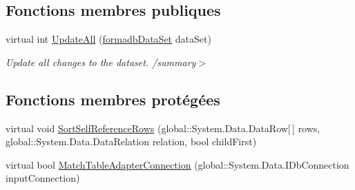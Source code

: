 \subsection*{Fonctions membres publiques}
\begin{DoxyCompactItemize}
\item 
virtual int \hyperlink{classforma_1_1formadb_data_set_table_adapters_1_1_table_adapter_manager_abcc62851436704e3322113c23c4fb2f8}{Update\+All} (\hyperlink{classforma_1_1formadb_data_set}{formadb\+Data\+Set} data\+Set)
\begin{DoxyCompactList}\small\item\em Update all changes to the dataset. /summary$>$ \end{DoxyCompactList}\end{DoxyCompactItemize}
\subsection*{Fonctions membres protégées}
\begin{DoxyCompactItemize}
\item 
virtual void \hyperlink{classforma_1_1formadb_data_set_table_adapters_1_1_table_adapter_manager_a57c735907cc021aa07f4f5aae3a5eb3d}{Sort\+Self\+Reference\+Rows} (global\+::\+System.\+Data.\+Data\+Row\mbox{[}$\,$\mbox{]} rows, global\+::\+System.\+Data.\+Data\+Relation relation, bool child\+First)
\item 
virtual bool \hyperlink{classforma_1_1formadb_data_set_table_adapters_1_1_table_adapter_manager_abe9aec4cd7f271107fa36d64c7591d1a}{Match\+Table\+Adapter\+Connection} (global\+::\+System.\+Data.\+I\+Db\+Connection input\+Connection)
\end{DoxyCompactItemize}
